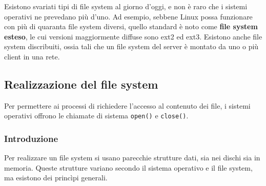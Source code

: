\documentclass[11pt,a4paper]{article}
\begin{document}
{Esistono svariati tipi di file system al giorno d'oggi, e non è raro che i sistemi operati­vi ne prevedano più d'uno. Ad esempio, sebbene Linux possa fun­zionare con più di quaranta file system diversi, quello standard è noto come \textbf{file system este­so}, le cui versioni maggiormente diffuse sono ext2 ed ext3. Esistono anche file system discribuiti, ossia tali che un file system del server è montato da uno o più client in una rete.

\subsection{Realizzazione del file system}
Per permettere ai processi di richiedere l'accesso al contenuto dei file, i sistemi operativi of­frono le chiamate di sistema \texttt{open()} e \texttt{close()}.

\subsubsection{Introduzione}
Per realizzare un file system si usano parecchie strutture dati, sia nei dischi sia in memoria.
Queste strutture variano secondo il sistema operativo e il file system, ma esistono dei prin­cìpi generali.

}
\end{document}

